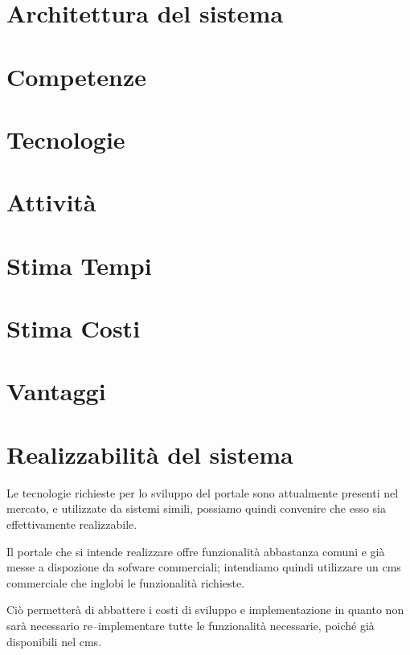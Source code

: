 \section{Architettura del sistema} 
\label{sec:architettura_sistema}

\section{Competenze} 
\label{sec:competenze}

\section{Tecnologie}
\label{sec:tecnologie}

\section{Attività} 
\label{sec:attivita}

\section{Stima Tempi} 
\label{sec:tempi}

\section{Stima Costi} 
\label{sec:costi}

\section{Vantaggi} 
\label{sec:vantaggi}



\section{Realizzabilità del sistema} %
\label{sec:realizzabilita_sistema}
Le tecnologie richieste per lo sviluppo del portale sono attualmente presenti nel mercato, e utilizzate da sistemi simili, possiamo quindi convenire che esso sia effettivamente realizzabile.

Il portale che si intende realizzare offre funzionalità abbastanza comuni e già messe a dispozione da sofware commerciali; intendiamo quindi utilizzare un \gls{cms} commerciale che inglobi le funzionalità richieste. 

Ciò permetterà di abbattere i costi di sviluppo e implementazione in quanto non sarà necessario re--implementare tutte le funzionalità necessarie, poiché già disponibili nel \gls{cms}.

